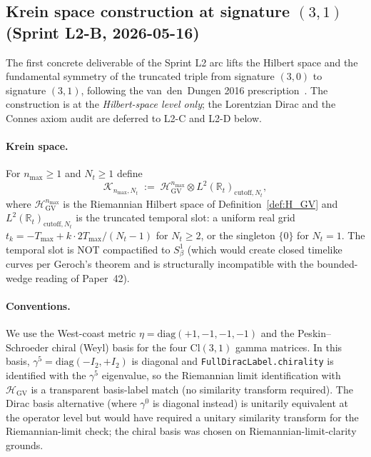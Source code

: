 \documentclass[11pt]{article}
\begin{document}
\subsection{Krein space construction at signature $(3, 1)$
(Sprint L2-B, 2026-05-16)}
\label{sec:l2b_krein}

The first concrete deliverable of the Sprint L2 arc lifts the Hilbert
space and the fundamental symmetry of the truncated triple from
signature $(3, 0)$ to signature $(3, 1)$, following the van~den~Dungen
2016 prescription~\cite{vandungen2016}.  The construction is at the
\emph{Hilbert-space level only}; the Lorentzian Dirac and the Connes
axiom audit are deferred to L2-C and L2-D below.

\paragraph{Krein space.}
For $n_{\max} \ge 1$ and $N_t \ge 1$ define
\begin{equation}
\label{eq:l2b_krein_space}
   \mathcal{K}_{n_{\max}, N_t}
   \;:=\; \mathcal{H}_{\mathrm{GV}}^{n_{\max}}
     \otimes L^2(\mathbb{R}_t)_{\mathrm{cutoff}, N_t},
\end{equation}
where $\mathcal{H}_{\mathrm{GV}}^{n_{\max}}$ is the Riemannian
Hilbert space of Definition~\ref{def:H_GV} and $L^2(\mathbb{R}_t)_{\mathrm{cutoff}, N_t}$
is the truncated temporal slot: a uniform real grid
$t_k = -T_{\max} + k \cdot 2 T_{\max}/(N_t - 1)$ for $N_t \ge 2$, or the
singleton $\{0\}$ for $N_t = 1$.  The temporal slot is NOT compactified
to $S^1_\beta$ (which would create closed timelike curves per Geroch's
theorem and is structurally incompatible with the bounded-wedge
reading of Paper~42).

\paragraph{Conventions.}
We use the West-coast metric $\eta = \mathrm{diag}(+1, -1, -1, -1)$
and the Peskin--Schroeder chiral (Weyl) basis for the four Cl$(3, 1)$
gamma matrices.  In this basis, $\gamma^5 = \mathrm{diag}(-I_2, +I_2)$
is diagonal and \verb|FullDiracLabel.chirality| is identified with
the $\gamma^5$ eigenvalue, so the Riemannian limit
identification with $\mathcal{H}_{\mathrm{GV}}$ is a transparent
basis-label match (no similarity transform required).  The Dirac
basis alternative (where $\gamma^0$ is diagonal instead) is
unitarily equivalent at the operator level but would have required
a unitary similarity transform for the Riemannian-limit check;
the chiral basis was chosen on Riemannian-limit-clarity grounds.
\end{document}
